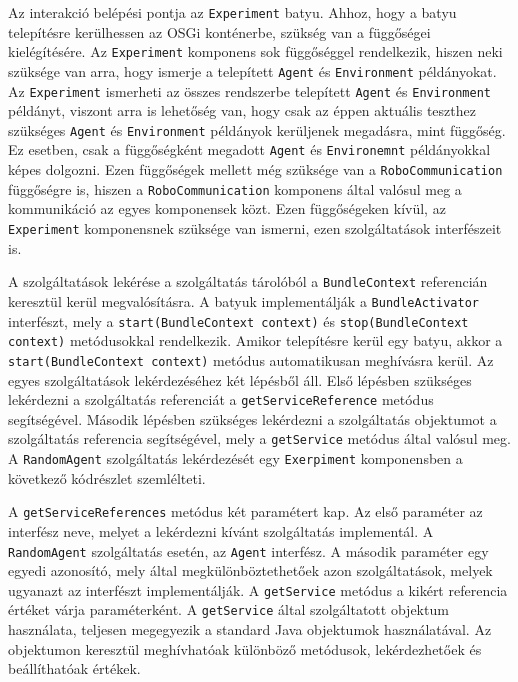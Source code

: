 Az interakció belépési pontja az \texttt{Experiment} batyu. Ahhoz, hogy a batyu telepítésre kerülhessen az OSGi konténerbe, szükség van a függőségei kielégítésére. Az \texttt{Experiment} komponens sok függőséggel rendelkezik, hiszen neki szüksége van arra, hogy ismerje a telepített \texttt{Agent} és \texttt{Environment} példányokat. Az \texttt{Experiment} ismerheti az összes rendszerbe telepített \texttt{Agent} és \texttt{Environment} példányt, viszont arra is lehetőség van, hogy csak az éppen aktuális teszthez szükséges \texttt{Agent} és \texttt{Environment} példányok kerüljenek megadásra, mint függőség. Ez esetben, csak a függőségként megadott \texttt{Agent} és \texttt{Environemnt} példányokkal képes dolgozni. Ezen függőségek mellett még szüksége van a \texttt{RoboCommunication} függőségre is, hiszen a \texttt{RoboCommunication} komponens által valósul meg a kommunikáció az egyes komponensek közt. Ezen függőségeken kívül, az \texttt{Experiment} komponensnek szüksége van ismerni, ezen szolgáltatások interfészeit is.


A szolgáltatások lekérése a szolgáltatás tárolóból a \texttt{BundleContext} referencián keresztül kerül megvalósításra. A batyuk implementálják a \texttt{BundleActivator} interfészt, mely a \texttt{start(BundleContext context)} és \texttt{stop(BundleContext context)} metódusokkal rendelkezik. Amikor telepítésre kerül egy batyu, akkor a \texttt{start(BundleContext context)} metódus automatikusan meghívásra kerül. Az egyes szolgáltatások lekérdezéséhez két lépésből áll. Első lépésben szükséges lekérdezni a szolgáltatás referenciát a \texttt{getServiceReference} metódus segítségével. Második lépésben szükséges lekérdezni a szolgáltatás objektumot a szolgáltatás referencia segítségével, mely a \texttt{getService} metódus által valósul meg. A \texttt{RandomAgent} szolgáltatás lekérdezését egy \texttt{Exerpiment} komponensben a következő kódrészlet szemlélteti. 
\lstset{language=Java}


A \texttt{getServiceReferences} metódus két paramétert kap. Az első paraméter az interfész neve, melyet a lekérdezni kívánt szolgáltatás implementál. A \texttt{RandomAgent} szolgáltatás esetén, az \texttt{Agent} interfész. A második paraméter egy egyedi azonosító, mely által megkülönböztethetőek azon szolgáltatások, melyek ugyanazt az interfészt implementálják. 
A \texttt{getService} metódus a kikért referencia értéket várja paraméterként. A \texttt{getService} által szolgáltatott objektum használata, teljesen megegyezik a standard Java objektumok használatával. Az objektumon keresztül meghívhatóak különböző metódusok, lekérdezhetőek és beállíthatóak értékek. 

